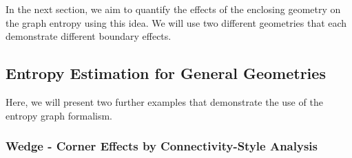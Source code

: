 \documentclass{article}
\begin{document}
    In the next section, we aim to quantify the effects of the enclosing geometry on the graph entropy using this idea. We will use two different geometries that each demonstrate different boundary effects.
    
    \subsection{Entropy Estimation for General Geometries}
        Here, we will present two further examples that demonstrate the use of the entropy graph formalism.

        \subsubsection{Wedge - Corner Effects by Connectivity-Style Analysis}
        \label{sec:entropy_mass}
        
\end{document}
